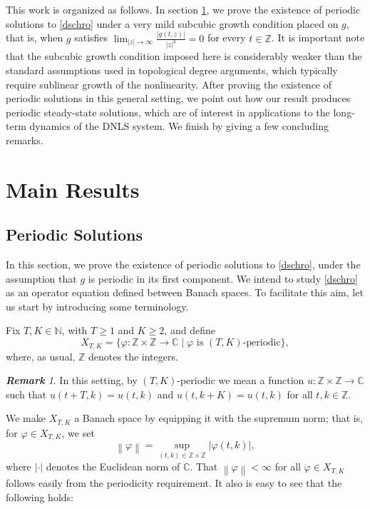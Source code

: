 \documentclass[12 pt,twoside]{amsart}
\newcommand{\N}{\mathbb{N}}
\newcommand{\C}{\mathbb{C}}
\newcommand{\Z}{\mathbb{Z}}
\newcommand{\norm}[1]{\left \lVert #1 \right \rVert}
\newcommand{\bes}{\begin{equation*}}
\newcommand{\ees}{\end{equation*}}
\renewcommand{\phi}{\varphi}
\numberwithin{equation}{section}
\theoremstyle{definition}
\theoremstyle{remark}
\newtheorem{remark}[theorem]{\bf Remark}
\begin{document}
This work is organized as follows. In section \ref{Main},  we prove the existence of periodic solutions to \eqref{dschro} under a very mild subcubic growth condition placed on $g$, that is, when $g$ satisfies $\lim_{|z|\to \infty}\frac{|g(t, z)|}{|z|^3}=0$ for every $t\in \Z$.   {It is important note that the subcubic growth condition imposed here is considerably weaker than the standard assumptions used in topological degree arguments, which typically require sublinear growth of the nonlinearity.} After proving the existence of periodic solutions in this general setting, we point out how our result produces periodic steady-state solutions, which are of interest in applications to the long-term dynamics of the DNLS system. We finish by giving a few concluding remarks.


\section{Main Results}\label{Main}
\subsection{Periodic Solutions}

In this section, we prove the existence of periodic solutions to \eqref{dschro}, under the assumption that $g$ is periodic in its first component. We intend to study \eqref{dschro} as an operator equation defined between Banach spaces.   To facilitate this aim, let us start by introducing some terminology.

Fix $T, K\in \N$, with $T\geq 1$ and $K\geq 2$, and define
\bes
X_{T,K}=\{\phi:\Z\times \Z\to \C\mid \phi \text{ is } (T,K)\text{-periodic}\},
\ees
where, as usual, $\Z$ denotes the integers.

\begin{remark}
In this setting, by $(T,K)$-periodic we mean a function $u:\Z\times \Z\to \C$ such that $u(t+T,k)=u(t,k)$  and $u(t, k+K)=u(t,k)$ for all $t,k\in \Z$.
\end{remark}

We make $X_{T,K}$ a Banach space by equipping it with the supremum norm; that is, for $\phi\in X_{T,K}$, we set
\bes
\norm{\phi}=\sup_{(t,k)\in \Z\times \Z}|\phi(t,k)|,
\ees
where $|\cdot|$ denotes the Euclidean norm of $\C$. That $\norm{\phi} <\infty$ for all $\phi\in X_{T,K}$ follows easily from the periodicity requirement.  It also is easy to see that the following holds:
\end{document}

